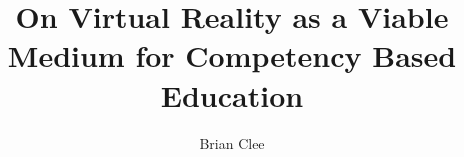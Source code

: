 \documentclass[11pt]{asu}
\title{On Virtual Reality as a Viable Medium for Competency Based Education}
\author{Brian Clee}
\begin{document}
	\begin{preliminary}
	\maketitle
        \makecopyright
        
	\tableofcontents
        \listoffigures
	\end{preliminary}


    \begin{doublespace}
    
    
    
    
    
    
    \end{doublespace}


   \begin{appendices}
      \begin{singlespace}
        
      \end{singlespace}    
   \end{appendices}

    \newpage
    
    
    \nocite{*}
    
    \newpage
    
\end{document}
